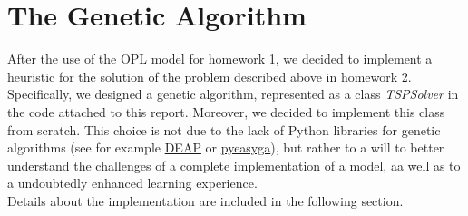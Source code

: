 \documentclass{article}
\begin{document}
\section{The Genetic Algorithm}\label{sec:algorithm}
After the use of the OPL model for homework 1, we decided to implement a heuristic for the solution of the problem described above in homework 2. Specifically, we designed a genetic algorithm, represented as a class \textit{TSPSolver} in the code attached to this report. Moreover, we decided to implement this class from scratch. This choice is not due to the lack of Python libraries for genetic algorithms (see for example \href{https://deap.readthedocs.io/en/master/}{DEAP} or  \href{https://pyeasyga.readthedocs.io/en/latest/index.html}{pyeasyga}), but rather to a will to better understand the challenges of a complete implementation of a model, aa well as to a undoubtedly enhanced learning experience. \\
Details about the implementation are included in the following section.
\end{document}
